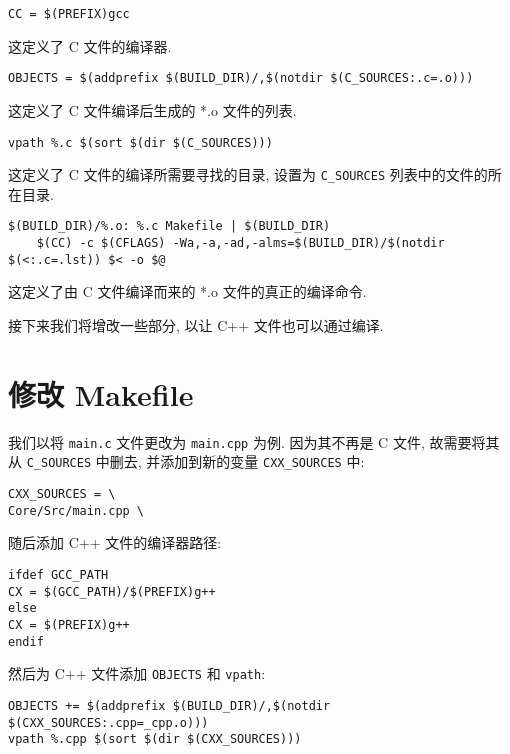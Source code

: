 \begin{verbatim}
CC = $(PREFIX)gcc
\end{verbatim}

这定义了 C 文件的编译器.

\begin{verbatim}
OBJECTS = $(addprefix $(BUILD_DIR)/,$(notdir $(C_SOURCES:.c=.o)))
\end{verbatim}

这定义了 C 文件编译后生成的 *.o 文件的列表.

\begin{verbatim}
vpath %.c $(sort $(dir $(C_SOURCES)))
\end{verbatim}

这定义了 C 文件的编译所需要寻找的目录, 设置为 \texttt{C\_SOURCES} 列表中的文件的所在目录.

\begin{verbatim}
$(BUILD_DIR)/%.o: %.c Makefile | $(BUILD_DIR) 
    $(CC) -c $(CFLAGS) -Wa,-a,-ad,-alms=$(BUILD_DIR)/$(notdir $(<:.c=.lst)) $< -o $@
\end{verbatim}

这定义了由 C 文件编译而来的 *.o 文件的真正的编译命令.

接下来我们将增改一些部分, 以让 C++ 文件也可以通过编译.

\section{修改 Makefile}
我们以将 \texttt{main.c} 文件更改为 \texttt{main.cpp} 为例. 因为其不再是 C 文件, 故需要将其从 \texttt{C\_SOURCES} 中删去, 并添加到新的变量 \texttt{CXX\_SOURCES} 中:

\begin{verbatim}
CXX_SOURCES = \
Core/Src/main.cpp \
\end{verbatim}

随后添加 C++ 文件的编译器路径:

\begin{verbatim}
ifdef GCC_PATH
CX = $(GCC_PATH)/$(PREFIX)g++
else
CX = $(PREFIX)g++
endif
\end{verbatim}

然后为 C++ 文件添加 \texttt{OBJECTS} 和 \texttt{vpath}:

\begin{verbatim}
OBJECTS += $(addprefix $(BUILD_DIR)/,$(notdir $(CXX_SOURCES:.cpp=_cpp.o)))
vpath %.cpp $(sort $(dir $(CXX_SOURCES)))
\end{verbatim}

